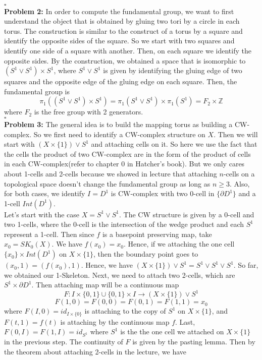 \documentclass[12pt]{amsart}
\newcommand{\Z}{\mathbb{Z}}
\begin{document}
\\\phantom{qed}\hfill$\square$\\
\textbf{Problem 2:} In order to compute the fundamental group, we want to first understand the object that is obtained by gluing two tori by a circle in each torus. The construction is similar to the construct of a torus by a square and identify the opposite sides of the square. So we start with two squares and identify one side of a square with another. Then, on each square we identify the opposite sides. By the construction, we obtained a space that is isomorphic to $(S^1\vee S^1)\times S^1$, where $S^1\vee S^1$ is given by identifying the gluing edge of two squares and the opposite edge of the gluing edge on each square. Then, the fundamental group is 
\[\pi_1((S^1\vee S^1)\times S^1)=\pi_1(S^1\vee S^1)\times \pi_1(S^1)=F_2\times\Z\]
where $F_2$ is the free group with 2 generators.
\\\phantom{qed}\hfill$\square$\\
\textbf{Problem 3:} The general idea is to build the mapping torus as building a CW-complex. So we first need to identify a CW-complex structure on $X$. Then we will start with $(X\times \{1\})\vee S^1$ and attaching cells on it. So here we use the fact that the cells the product of two CW-complex are in the form of the product of cells in each CW-complex(refer to chapter 0 in Hatcher's book). But we only cares about 1-cells and 2-cells because we showed in lecture that attaching $n$-cells on a topological space doesn't change the fundamental group as long as $n\geq 3$. Also, for both cases, we identify $I=D^1$ is CW-complex with two 0-cell in $\{\partial D^1\}$ and a 1-cell $Int(D^1)$.\\
Let's start with the case $X=S^1\vee S^1$. The CW structure is given by a 0-cell and two 1-cells, where the 0-cell is the intersection of the wedge product and each $S^1$ represent a 1-cell. Then since $f$ is a basepoint preserving map, take $x_0=SK_0(X)$. We have $f(x_0)=x_0$. Hence, if we attaching the one cell $\{x_0\}\times Int(D^1)$ on $X\times \{1\}$, then the boundary point goes to $(x_0,1)=(f(x_0),1)$. Hence, we have $(X\times \{1\})\vee S^1=S^1\vee S^1\vee S^1$. So far, we obtained our 1-Skeleton. Next, we need to attach two 2-cells, which are $S^1\times \partial D^1$. Then attaching map will be a continuous map 
\[F:I\times\{0,1\}\cup\{0,1\} \times I\to (X\times \{1\})\vee S^1\]
\[F(1,0)=F(0,0)=F(0,1)=F(1,1)=x_0\]
where $F(I,0)=id_{I\times \{0\}}$ is attaching to the copy of $S^1$ on $X\times \{1\}$, and $F(t,1)=f(t)$ is attaching by the continuous map $f$. Last, $F(0,I)=F(1,I)=id_{S^1}$ where $S^1$ is the the one cell we attached on $X\times \{1\}$ in the previous step. The continuity of $F$ is given by the pasting lemma. Then by the theorem about attaching 2-cells in the lecture, we have 
\end{document}
